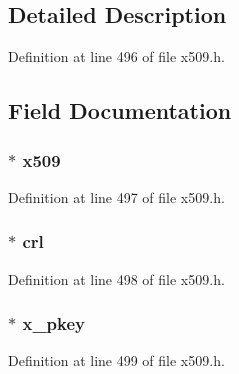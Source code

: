 \subsection{Detailed Description}


Definition at line 496 of file x509.\+h.



\subsection{Field Documentation}
\subsubsection[{\texorpdfstring{x509}{x509}}]{ $\ast$ x509}\hypertarget{struct_x509__info__st_adf3937adedbf4fffe3a813a89b5b4c8d}{}\label{struct_x509__info__st_adf3937adedbf4fffe3a813a89b5b4c8d}


Definition at line 497 of file x509.\+h.

\subsubsection[{\texorpdfstring{crl}{crl}}]{ $\ast$ crl}\hypertarget{struct_x509__info__st_a097ce42aa48bbc5d44148e782c3d56ae}{}\label{struct_x509__info__st_a097ce42aa48bbc5d44148e782c3d56ae}


Definition at line 498 of file x509.\+h.

\subsubsection[{\texorpdfstring{x\+\_\+pkey}{x_pkey}}]{ $\ast$ x\+\_\+pkey}\hypertarget{struct_x509__info__st_a27edb5dd0e5f313ed9c3cdcbf0ecf7c7}{}\label{struct_x509__info__st_a27edb5dd0e5f313ed9c3cdcbf0ecf7c7}


Definition at line 499 of file x509.\+h.


